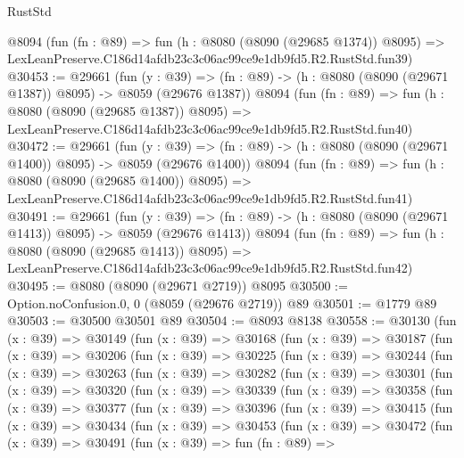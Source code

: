 \begin{lexlean}{RustStd}
\begin{coremodule}
    @8094
    (fun (fn : @89) =>
    fun (h : @8080 (@8090 (@29685 @1374)) @8095) =>
    LexLeanPreserve.C186d14afdb23c3c06ac99ce9e1db9fd5.R2.RustStd.fun39)
@30453 := @29661
    (fun (y : @39) =>
    (fn : @89) -> (h : @8080 (@8090 (@29671 @1387)) @8095) -> @8059 (@29676 @1387))
    @8094
    (fun (fn : @89) =>
    fun (h : @8080 (@8090 (@29685 @1387)) @8095) =>
    LexLeanPreserve.C186d14afdb23c3c06ac99ce9e1db9fd5.R2.RustStd.fun40)
@30472 := @29661
    (fun (y : @39) =>
    (fn : @89) -> (h : @8080 (@8090 (@29671 @1400)) @8095) -> @8059 (@29676 @1400))
    @8094
    (fun (fn : @89) =>
    fun (h : @8080 (@8090 (@29685 @1400)) @8095) =>
    LexLeanPreserve.C186d14afdb23c3c06ac99ce9e1db9fd5.R2.RustStd.fun41)
@30491 := @29661
    (fun (y : @39) =>
    (fn : @89) -> (h : @8080 (@8090 (@29671 @1413)) @8095) -> @8059 (@29676 @1413))
    @8094
    (fun (fn : @89) =>
    fun (h : @8080 (@8090 (@29685 @1413)) @8095) =>
    LexLeanPreserve.C186d14afdb23c3c06ac99ce9e1db9fd5.R2.RustStd.fun42)
@30495 := @8080 (@8090 (@29671 @2719)) @8095
@30500 := Option.noConfusion.{0, 0} (@8059 (@29676 @2719)) @89
@30501 := @1779 @89
@30503 := @30500 @30501 @89
@30504 := @8093 @8138
@30558 := @30130
    (fun (x : @39) =>
    @30149
      (fun (x : @39) =>
      @30168
        (fun (x : @39) =>
        @30187
          (fun (x : @39) =>
          @30206
            (fun (x : @39) =>
            @30225
              (fun (x : @39) =>
              @30244
                (fun (x : @39) =>
                @30263
                  (fun (x : @39) =>
                  @30282
                    (fun (x : @39) =>
                    @30301
                      (fun (x : @39) =>
                      @30320
                        (fun (x : @39) =>
                        @30339
                          (fun (x : @39) =>
                          @30358
                            (fun (x : @39) =>
                            @30377
                              (fun (x : @39) =>
                              @30396
                                (fun (x : @39) =>
                                @30415
                                  (fun (x : @39) =>
                                  @30434
                                    (fun (x : @39) =>
                                    @30453
                                      (fun (x : @39) =>
                                      @30472
                                        (fun (x : @39) =>
                                        @30491
                                          (fun (x : @39) =>
                                          fun (fn : @89) =>

\end{coremodule}
\end{lexlean}
